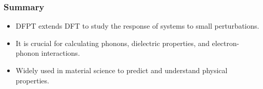 \documentclass{CustomBeamer}
\begin{document}
    
    
    \begin{frame}
    \frametitle{Summary}
    \begin{itemize}
        \item DFPT extends DFT to study the response of systems to small perturbations.
        \item It is crucial for calculating phonons, dielectric properties, and electron-phonon interactions.
        \item Widely used in material science to predict and understand physical properties.
    \end{itemize}
    \end{frame}
    
\end{document}
